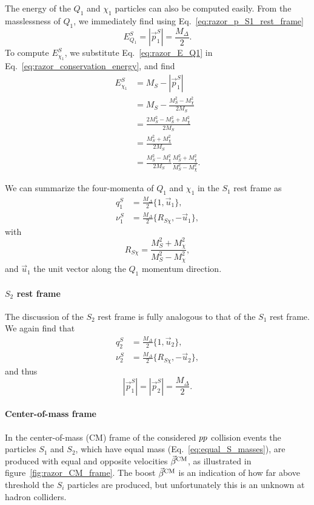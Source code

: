 The energy of the $Q_1$ and $\chi_1$ particles can also be computed easily. 
From the masslessness of $Q_1$, we immediately find using Eq.~\ref{eq:razor_p_S1_rest_frame}
\begin{equation}
  E^S_{Q_1} = |\vec{p}^S_1| = \frac{M_\Delta}{2}. \label{eq:razor_E_Q1}
\end{equation}
To compute $E^S_{\chi_1}$, we substitute Eq.~\ref{eq:razor_E_Q1} in 
Eq.~\ref{eq:razor_conservation_energy}, and find 
\begin{align}
  E^S_{\chi_1} &= M_S - |\vec{p}^S_1|\\
	       &= M_S - \frac{M_S^2 -M_{\chi}^2}{2 M_S} \\
	       &= \frac{2M_S^2 - M_S^2 + M_{\chi}^2}{2 M_S} \\
	       &= \frac{M_S^2 + M_{\chi}^2}{2 M_S} \\
	       &= \frac{M_S^2 - M_{\chi}^2}{2 M_S} \frac{M_S^2 + M_{\chi}^2}{M_S^2 - M_{\chi}^2} .
\end{align}

We can summarize the four-momenta of $Q_1$ and $\chi_1$ in the $S_1$ rest frame as
\begin{align}
  q_1^S   &= \frac{M_\Delta}{2} \{ 1, \vec{u}_1\} , \\  
  \nu_1^S &= \frac{M_\Delta}{2} \{ R_{S\chi}, -\vec{u}_1\} ,
\end{align}
with $$R_{S\chi} = \frac{M_S^2 + M_{\chi}^2}{M_S^2 - M_{\chi}^2},$$ and $\vec{u}_1$ the unit
vector along the $Q_1$ momentum direction.



\paragraph{$S_2$ rest frame}
The discussion of the $S_2$ rest frame is fully analogous to that of the $S_1$ rest frame. We
again find that
\begin{align}
  q_2^S   &= \frac{M_\Delta}{2} \{ 1, \vec{u}_2\} , \\  
  \nu_2^S &= \frac{M_\Delta}{2} \{ R_{S\chi}, -\vec{u}_2\} ,
\end{align}
and thus
\begin{equation}
  |\vec{p}^S_1| = |\vec{p}^S_2| = \frac{M_\Delta}{2} . \label{eq:razor_equal_momenta}
\end{equation}


\paragraph{Center-of-mass frame}
In the center-of-mass (CM) frame of the considered ${p}{p}$ collision events the particles $S_1$
and $S_2$, which have equal mass (Eq.~\ref{eq:equal_S_masses}), are produced with equal and opposite
velocities $\vec{\beta}^{\textrm{CM}}$, as illustrated in figure~\ref{fig:razor_CM_frame}. The boost $\vec{\beta}^{\textrm{CM}}$ is an
indication of how far above threshold the $S_i$ particles are produced, but unfortunately this is
an unknown at hadron colliders. 

